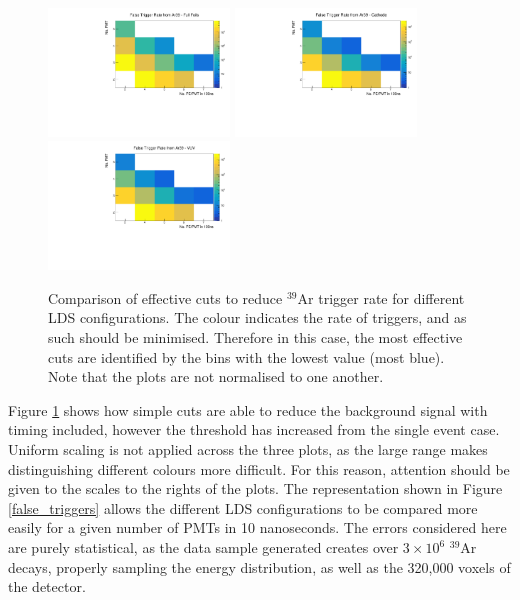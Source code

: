 \documentclass[a4paper]{article}
\begin{document}
\begin{figure}[H]
  \center
      \includegraphics[width=0.43\textwidth]{ar39_trigger_map_fullfoils.pdf}
      \includegraphics[width=0.43\textwidth]{ar39_trigger_map_cathode.pdf}
      \includegraphics[width=0.43\textwidth]{ar39_trigger_map_vuv.pdf}
      \caption{Comparison of effective cuts to reduce $^{39}$Ar trigger rate for different LDS configurations. The colour indicates the rate of triggers, and as such should be minimised. Therefore in this case, the most effective cuts are identified by the bins with the lowest value (most blue). Note that the plots are not normalised to one another.}\label{ar39_cut_maps} %
\end{figure}

Figure \ref{ar39_cut_maps} shows how simple cuts are able to reduce the background signal with timing included, however the threshold has increased from the single event case. Uniform scaling is not applied across the three plots, as the large range makes distinguishing different colours more difficult. For this reason, attention should be given to the scales to the rights of the plots. The representation shown in Figure \ref{false_triggers} allows the different LDS configurations to be compared more easily for a given number of PMTs in 10 nanoseconds. The errors considered here are purely statistical, as the data sample generated creates over $3 \times 10^{6}$ $^{39}$Ar decays, properly sampling the energy distribution, as well as the 320,000 voxels of the detector.
\end{document}
